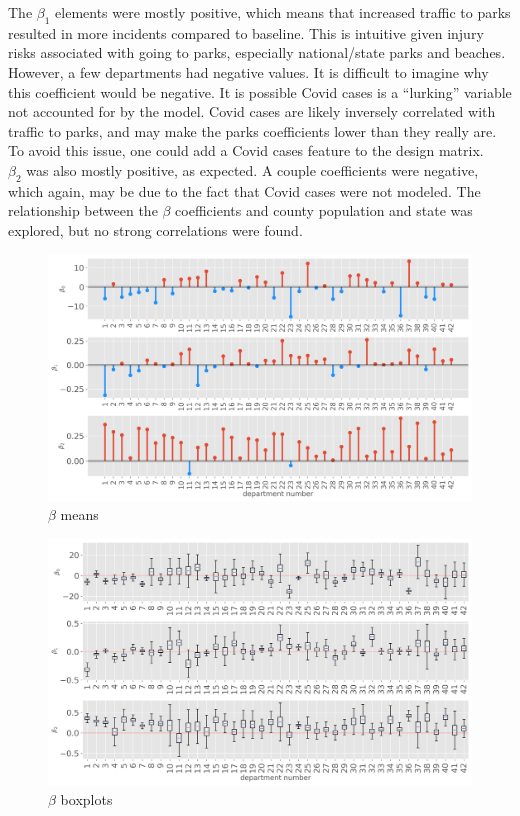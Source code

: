 \documentclass[paper=a4, fontsize=11pt]{scrartcl}
\begin{document}
The $\beta_1$ elements were mostly positive, which means that increased traffic to parks resulted in more incidents compared to baseline. This is intuitive given injury risks associated with going to parks, especially national/state parks and beaches. However, a few departments had negative values. It is difficult to imagine why this coefficient would be negative. It is possible Covid cases  is a ``lurking'' variable not accounted for by the model. Covid cases are likely inversely correlated with traffic to parks, and may make the parks coefficients lower than they really are.  To avoid this issue, one could add a Covid cases feature to the design matrix.\\


 $\beta_2$ was also mostly positive, as expected. A couple coefficients were negative, which again, may be due to the fact that Covid cases were not modeled. The relationship between the $\beta$ coefficients and county population and state was explored, but no strong correlations were found.\\



\begin{figure}[!htb]\label{all_betas}
\centering
\includegraphics[width=1\textwidth]{project/writeup/mean_betas.png}
\caption{$\beta$ means}\end{figure}


\begin{figure}[!htb]\label{boxplot}
\centering
\includegraphics[width=1\textwidth]{project/writeup/box_plots.png}
\caption{$\beta$ boxplots}
\end{figure}
\end{document}
